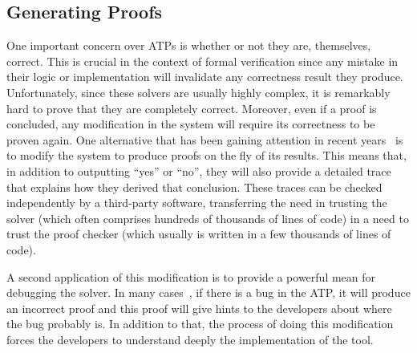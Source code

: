 \documentclass[a4paper, 12pt]{article}
\begin{document}
\subsection{Generating Proofs}
One important concern over ATPs is whether or not they are, themselves, correct. This is crucial
in the context of formal verification since any mistake in their logic or implementation will invalidate any
correctness result they produce. Unfortunately, since these solvers are usually highly complex,
it is remarkably hard to prove that they are completely correct. Moreover, even if a proof is concluded,
any modification in the system will require its correctness to be proven again. One alternative that has been
gaining attention in recent years~\cite{generatingProofs, proofsInSmt} is to modify the system to produce
proofs on the fly of its results. This means that, in addition to outputting ``yes'' or ``no'', they will
also provide a detailed trace that explains how they derived that conclusion. These traces can be
checked independently by a third-party software, transferring the need in trusting the solver (which often
comprises hundreds of thousands of lines of code) in a need to trust the proof checker (which usually is
written in a few thousands of lines of code).

A second application of this modification is to provide a powerful mean for debugging the solver.
In many cases~\cite{generatingProofs}, if there is a bug in the ATP, it will produce an incorrect
proof and this proof will give hints to the developers about where the bug probably is.
In addition to that, the process of doing this modification forces
the developers to understand deeply the implementation of the tool.
\end{document}
